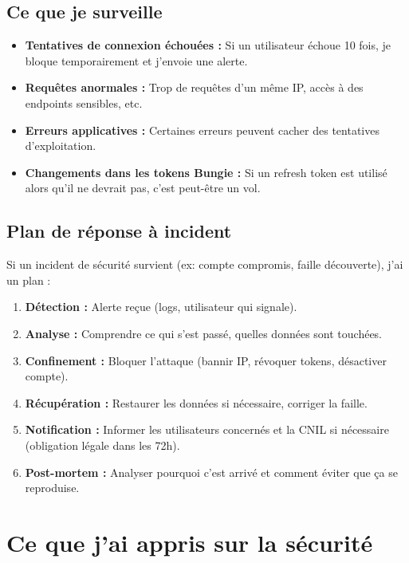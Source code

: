 \subsection{Ce que je surveille}

\begin{itemize}
    \item \textbf{Tentatives de connexion échouées :} Si un utilisateur échoue 10 fois, je bloque temporairement et j'envoie une alerte.
    \item \textbf{Requêtes anormales :} Trop de requêtes d'un même IP, accès à des endpoints sensibles, etc.
    \item \textbf{Erreurs applicatives :} Certaines erreurs peuvent cacher des tentatives d'exploitation.
    \item \textbf{Changements dans les tokens Bungie :} Si un refresh token est utilisé alors qu'il ne devrait pas, c'est peut-être un vol.
\end{itemize}

\subsection{Plan de réponse à incident}

Si un incident de sécurité survient (ex: compte compromis, faille découverte), j'ai un plan :

\begin{enumerate}
    \item \textbf{Détection :} Alerte reçue (logs, utilisateur qui signale).
    \item \textbf{Analyse :} Comprendre ce qui s'est passé, quelles données sont touchées.
    \item \textbf{Confinement :} Bloquer l'attaque (bannir IP, révoquer tokens, désactiver compte).
    \item \textbf{Récupération :} Restaurer les données si nécessaire, corriger la faille.
    \item \textbf{Notification :} Informer les utilisateurs concernés et la CNIL si nécessaire (obligation légale dans les 72h).
    \item \textbf{Post-mortem :} Analyser pourquoi c'est arrivé et comment éviter que ça se reproduise.
\end{enumerate}

\section{Ce que j'ai appris sur la sécurité}

